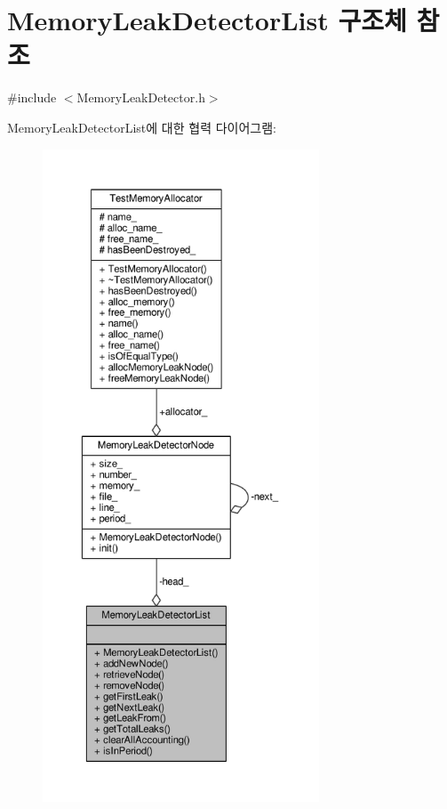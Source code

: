 \hypertarget{struct_memory_leak_detector_list}{}\section{Memory\+Leak\+Detector\+List 구조체 참조}
\label{struct_memory_leak_detector_list}


{\ttfamily \#include $<$Memory\+Leak\+Detector.\+h$>$}



Memory\+Leak\+Detector\+List에 대한 협력 다이어그램\+:
\nopagebreak
\begin{figure}[H]
\begin{center}
\leavevmode
\includegraphics[height=550pt]{struct_memory_leak_detector_list__coll__graph}
\end{center}
\end{figure}
